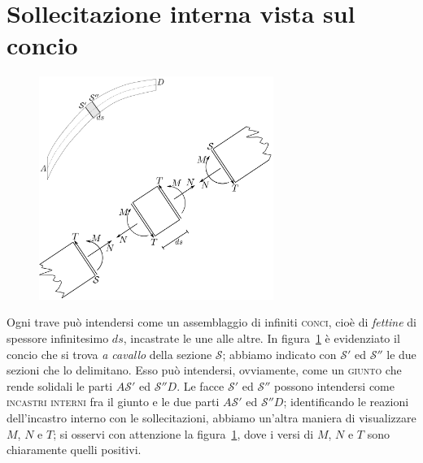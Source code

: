 \section{Sollecitazione interna vista sul concio}
\renewcommand{\thefigure}{12~-~2}
\begin{figure}[ht]
\centering
\includegraphics[width=0.68\textwidth]{Immagini/Parte_12/Figura12_2/figura12_2.pdf}
\caption{}
\label{figura12-2}
\end{figure}
Ogni trave può intendersi come un assemblaggio di infiniti \textsc{conci}, cioè di \emph{fettine} di spessore infinitesimo $ds$, incastrate le une alle altre. In figura~\ref{figura12-2} è evidenziato il concio che si trova \emph{a cavallo} della sezione $\mathcal{S}$; abbiamo indicato con $\mathcal{S}'$ ed $\mathcal{S}''$ le due sezioni che lo delimitano. Esso può intendersi, ovviamente, come un \textsc{giunto} che rende solidali le parti $A\mathcal{S}'$ ed $\mathcal{S}''D$. Le facce $\mathcal{S}'$ ed $\mathcal{S}''$ possono intendersi come \textsc{incastri interni} fra il giunto e le due parti $A\mathcal{S}'$ ed $\mathcal{S}''D$; identificando le reazioni dell'incastro interno con le sollecitazioni, abbiamo un'altra maniera di visualizzare $M$, $N$ e $T$; si osservi con attenzione la figura~\ref{figura12-2}, dove i versi di $M$, $N$ e $T$ sono chiaramente quelli positivi.
